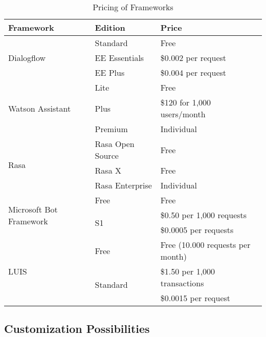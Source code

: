 \begin{table}[H]
    \centering
    \begin{tabular}{ l | l | l }
        Framework & Edition & Price \\ \hline \hline
        \multirow{3}{*}{Dialogflow} & Standard & Free \\
        & EE Essentials &  \$0.002 per request\\
        & EE Plus & \$0.004 per request \\ \hline

        \multirow{3}{*}{Watson Assistant} & Lite & Free \\
        & Plus &  \$120 for 1,000 users/month\\
        & Premium & Individual \\ \hline

        \multirow{3}{*}{Rasa} & Rasa Open Source & Free \\
        & Rasa X &  Free\\
        & Rasa Enterprise & Individual \\ \hline

        
        \multirow{3}{*}{Microsoft Bot Framework} & Free  & Free \\
        & \multirow{2}{*}{S1} & \$0.50 per 1,000 requests \\ 
        & & \$0.0005 per requests \\ \hline
                
        \multirow{3}{*}{LUIS} & Free  & Free (10.000 requests per month) \\
        & \multirow{2}{*}{Standard} &  \$1.50 per 1,000 transactions\\
        & &  \$0.0015 per request
    \end{tabular}
    \caption{Pricing of Frameworks \cite{rasa, dialogflow, watsonassistant}} \label{tab:pricing}
\end{table} \noindent


\subsection*{Customization Possibilities}

